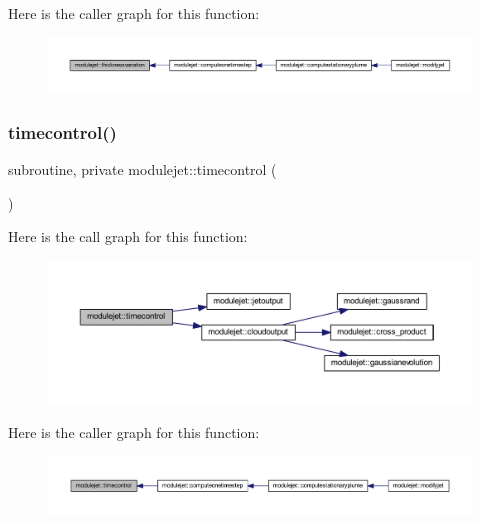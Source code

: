 Here is the caller graph for this function\+:\nopagebreak
\begin{figure}[H]
\begin{center}
\leavevmode
\includegraphics[width=350pt]{namespacemodulejet_a5241bdca6d72d79d96fdc8d9b63a291a_icgraph}
\end{center}
\end{figure}
\mbox{\label{namespacemodulejet_a7518a8afbcafcfeedfc10f5a3a205b33}} 
\subsubsection{\texorpdfstring{timecontrol()}{timecontrol()}}
{\footnotesize\ttfamily subroutine, private modulejet\+::timecontrol (\begin{DoxyParamCaption}{ }\end{DoxyParamCaption})\hspace{0.3cm}{\ttfamily [private]}}

Here is the call graph for this function\+:\nopagebreak
\begin{figure}[H]
\begin{center}
\leavevmode
\includegraphics[width=350pt]{namespacemodulejet_a7518a8afbcafcfeedfc10f5a3a205b33_cgraph}
\end{center}
\end{figure}
Here is the caller graph for this function\+:\nopagebreak
\begin{figure}[H]
\begin{center}
\leavevmode
\includegraphics[width=350pt]{namespacemodulejet_a7518a8afbcafcfeedfc10f5a3a205b33_icgraph}
\end{center}
\end{figure}
\mbox{\label{namespacemodulejet_aaa0ceb23e085072c0cf5693f217b27ea}} 
